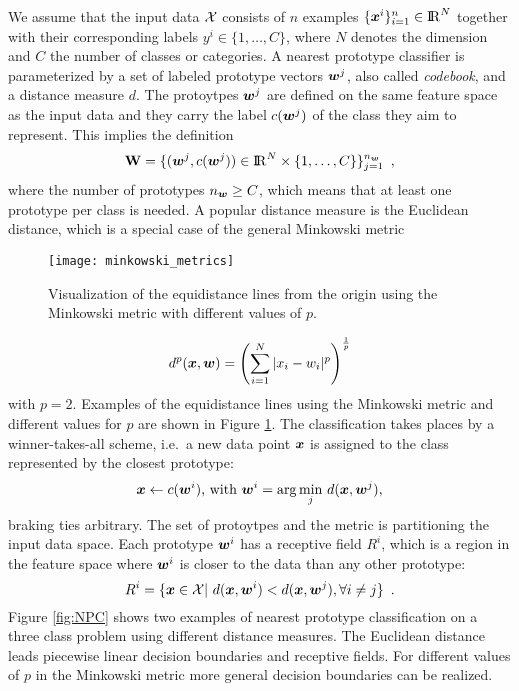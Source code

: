 We assume that the input data $\mathcal{X}$ consists of $n$ examples 
$\{\boldsymbol{x}^i\}_{i=1}^n\in{\rm I\!R}^N$ together with their corresponding labels 
$y^i\in\{1,\dots, C\}$, where $N$ denotes the dimension and $C$ the number of classes or categories. 
A nearest prototype classifier is parameterized by a set of labeled prototype vectors $\boldsymbol{w}^j$, 
also called {\it codebook}, and a distance measure $d$. 
The protoytpes $\boldsymbol{w}^j$ are defined on the same feature space as the input data and they carry 
the label $c(\boldsymbol{w}^j)$ of the class they aim to represent. 
This implies the definition
\begin{equation}
\label{eq:W}
\mathbf{W} = \{ (\boldsymbol{w}^j,c(\boldsymbol{w}^j))\in {\rm I\!R}^N \times\{1,\dots, C\}\}_{j=1}^{n_{\boldsymbol{w}}}\enspace ,
\end{equation}
where the number of prototypes $n_{\boldsymbol{w}}\ge C$, which means that at least one prototype per class is needed. 
A popular distance measure is the Euclidean distance, which is a special case of the general Minkowski metric
\begin{figure}[tpb]
\centering
\texttt{[image: minkowski\_metrics]}%
\caption[Equidistance lines using the Minkowski metric]{Visualization of the equidistance lines from the origin using the 
Minkowski metric with different values of $p$.}
\label{fig:Minkowski}
\end{figure}
\begin{equation}
\label{eq:minkowski}
 d^p(\boldsymbol{x},\boldsymbol{w}) = \left(\sum_{i=1}^N |x_i-w_i|^p\right)^\frac{1}{p}
\end{equation}
with $p=2$. 
Examples of the equidistance lines using the Minkowski metric and different values for $p$ are shown in Figure \ref{fig:Minkowski}. 
The classification takes places by a winner-takes-all scheme, i.e.\ a new data point $\boldsymbol{x}$ is assigned to the class represented by 
the closest prototype:
\begin{equation}
\label{eq:nearest_prototype_classification}
 \v{x} \leftarrow c(\v{w}^i)\text{, with }\v{w}^i=\arg\underset{j}{\min}\ d(\v{x},\v{w}^j),
\end{equation}
braking ties arbitrary. The set of protoytpes and the metric is partitioning the input data space. 
Each prototype $\boldsymbol{w}^i$ has a receptive field $R^i$, which is a region in the feature space where $\boldsymbol{w}^i$ 
is closer to the data than any other prototype:
\begin{equation}
\label{eq:Receptive_field_prototypes}
 R^i = \{ \boldsymbol{x}\in \mathcal{X}|\ d(\boldsymbol{x},\boldsymbol{w}^i)<d(\boldsymbol{x},\boldsymbol{w}^j), \forall i\neq j \} \enspace .
\end{equation}
Figure \ref{fig:NPC} shows two examples of nearest prototype classification on a three class problem using different distance measures. 
The Euclidean distance leads piecewise linear decision boundaries and receptive fields. 
For different values of $p$ in the Minkowski metric more general decision boundaries can be realized. 

